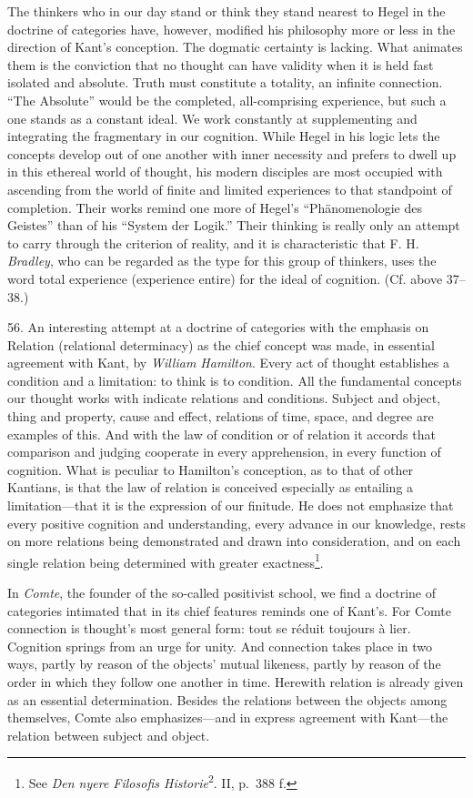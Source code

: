 \documentclass[12pt,a4paper]{book}
\newcommand{\opage}[1]{\marginnote{\footnotesize\textit{[#1]}}}
\begin{document}
\opage{150}The thinkers who in our day stand or think they stand nearest to Hegel in the
doctrine of categories have, however, modified his philosophy more or less in
the direction of Kant's conception. The dogmatic certainty is lacking. What
animates them is the conviction that no thought can have validity when it is
held fast isolated and absolute. Truth must constitute a totality, an infinite
connection. ``The Absolute'' would be the completed, all-comprising
experience, but such a one stands as a constant ideal. We work constantly at
supplementing and integrating the fragmentary in our cognition. While Hegel in
his logic lets the concepts develop out of one another with inner necessity
and prefers to dwell up in this ethereal world of thought, his modern
disciples are most occupied with ascending from the world of finite and
limited experiences to that standpoint of completion. Their works remind one
more of Hegel's ``Phänomenologie des Geistes'' than of his ``System der
Logik.'' Their thinking is really only an attempt to carry through the
criterion of reality, and it is characteristic that F. H. \emph{Bradley}, who
can be regarded as the type for this group of thinkers, uses the word total
experience (experience entire) for the ideal of cognition. (Cf. above
37--38.)

56. An interesting attempt at a doctrine of categories with the emphasis on
Relation (relational determinacy) as the chief concept was made, in essential
agreement with Kant, by \emph{William Hamilton}. Every act of thought
establishes a condition and a limitation: to think is to condition. All the
fundamental concepts our thought works with indicate relations and
conditions. Subject and object, thing and property, cause and effect,
relations of time, space, and degree are examples of this. And with the law
of condition or of relation it accords that comparison and judging cooperate
in every apprehension, in every function of cognition. What is peculiar to
Hamilton's conception, as to that of other Kantians, is that the law of
relation is conceived especially as entailing a limitation---that it is the
expression of our finitude. He does not emphasize that every positive
cognition and understanding, every \opage{151}advance in our knowledge, rests on more
relations being demonstrated and drawn into consideration, and on each single
relation being determined with greater exactness\footnote{See \emph{Den nyere
Filosofis Historie}\textsuperscript{2}. II, p.~388 f.}.

In \emph{Comte}, the founder of the so-called positivist school, we find a
doctrine of categories intimated that in its chief features reminds one of
Kant's. For Comte connection is thought's most general form: tout se réduit
toujours à lier. Cognition springs from an urge for unity. And connection
takes place in two ways, partly by reason of the objects' mutual likeness,
partly by reason of the order in which they follow one another in time.
Herewith relation is already given as an essential determination. Besides the
relations between the objects among themselves, Comte also emphasizes---and in
express agreement with Kant---the relation between subject and object.
\end{document}
